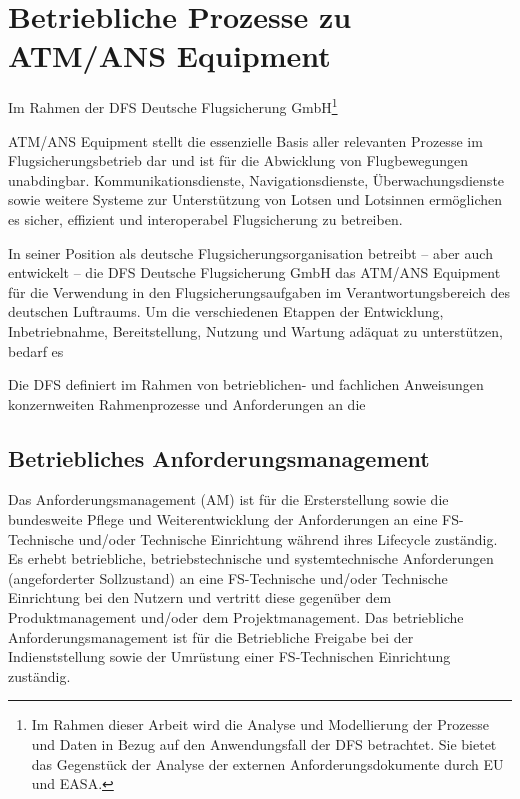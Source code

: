 \chapter{Betriebliche Prozesse zu ATM/ANS Equipment}

\begin{center}
    \footnotesize
    Im Rahmen der DFS Deutsche Flugsicherung GmbH\footnote{Im Rahmen dieser Arbeit wird die Analyse und Modellierung der Prozesse und Daten in Bezug auf den Anwendungsfall der DFS betrachtet. Sie bietet das Gegenstück der Analyse der externen Anforderungsdokumente durch EU und EASA.}
\end{center}
\noindent

ATM/ANS Equipment stellt die essenzielle Basis aller relevanten Prozesse im Flugsicherungsbetrieb dar und ist für die Abwicklung von Flugbewegungen unabdingbar. 
Kommunikationsdienste, Navigationsdienste, Überwachungsdienste sowie weitere Systeme zur Unterstützung von Lotsen und Lotsinnen ermöglichen es sicher, effizient und interoperabel Flugsicherung zu betreiben.


In seiner Position als deutsche Flugsicherungsorganisation betreibt -- aber auch entwickelt -- die DFS Deutsche Flugsicherung GmbH das ATM/ANS Equipment für die Verwendung in den Flugsicherungsaufgaben im Verantwortungsbereich des deutschen Luftraums. 
Um die verschiedenen Etappen der Entwicklung, Inbetriebnahme, Bereitstellung, Nutzung und Wartung adäquat zu unterstützen, bedarf es 
\cite[§27c]{luftvg}


Die \ac{DFS} definiert im Rahmen von betrieblichen- und fachlichen Anweisungen konzernweiten Rahmenprozesse und Anforderungen an die   


    \section{Betriebliches Anforderungsmanagement}

Das Anforderungsmanagement (AM) ist für die Ersterstellung sowie die bundesweite Pflege und Weiterentwicklung der Anforderungen an eine FS-Technische und/oder Technische Einrichtung während ihres Lifecycle zuständig. Es erhebt betriebliche, betriebstechnische und systemtechnische Anforderungen (angeforderter Sollzustand) an eine FS-Technische und/oder Technische Einrichtung bei den Nutzern und vertritt diese gegenüber dem Produktmanagement und/oder dem Projektmanagement. Das betriebliche Anforderungsmanagement ist für die Betriebliche Freigabe bei der Indienststellung sowie der Umrüstung einer FS-Technischen Einrichtung zuständig. 


